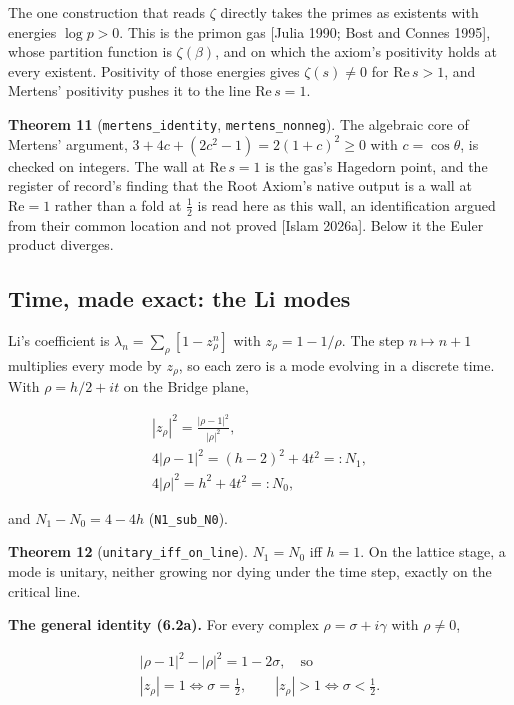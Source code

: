 \documentclass[10pt,twocolumn]{article}
\begin{document}
The one construction that reads \(\zeta\) directly takes the primes as
existents with energies \(\log p > 0\). This is the primon gas {[}Julia
1990; Bost and Connes 1995{]}, whose partition function is
\(\zeta(\beta)\), and on which the axiom's positivity holds at every
existent. Positivity of those energies gives \(\zeta(s) \neq 0\) for
\(\mathrm{Re}\, s > 1\), and Mertens' positivity pushes it to the line
\(\mathrm{Re}\, s = 1\).

\textbf{Theorem 11} (\texttt{mertens\_identity},
\texttt{mertens\_nonneg}). The algebraic core of Mertens' argument,
\(3 + 4c + (2c^2 - 1) = 2(1 + c)^2 \geq 0\) with \(c = \cos\theta\), is
checked on integers. The wall at \(\mathrm{Re}\, s = 1\) is the gas's
Hagedorn point, and the register of record's finding that the Root
Axiom's native output is a wall at \(\mathrm{Re} = 1\) rather than a
fold at \(\tfrac12\) is read here as this wall, an identification argued
from their common location and not proved {[}Islam 2026a{]}. Below it
the Euler product diverges.

\hypertarget{time-made-exact-the-li-modes}{%
\subsection{Time, made exact: the Li
modes}\label{time-made-exact-the-li-modes}}

Li's coefficient is \(\lambda_n = \sum_\rho [1 - z_\rho^n]\) with
\(z_\rho = 1 - 1/\rho\). The step \(n \mapsto n + 1\) multiplies every
mode by \(z_\rho\), so each zero is a mode evolving in a discrete time.
With \(\rho = h/2 + it\) on the Bridge plane,

\[\begin{gathered}|z_\rho|^2 = \frac{|\rho - 1|^2}{|\rho|^2}, \\ 4|\rho-1|^2 = (h-2)^2 + 4t^2 =: N_1, \\ 4|\rho|^2 = h^2 + 4t^2 =: N_0,\end{gathered}\]

and \(N_1 - N_0 = 4 - 4h\) (\texttt{N1\_sub\_N0}).

\textbf{Theorem 12} (\texttt{unitary\_iff\_on\_line}). \(N_1 = N_0\) iff
\(h = 1\). On the lattice stage, a mode is unitary, neither growing nor
dying under the time step, exactly on the critical line.

\textbf{The general identity (6.2a).} For every complex
\(\rho = \sigma + i\gamma\) with \(\rho \neq 0\),

\[\begin{gathered}|\rho - 1|^2 - |\rho|^2 = 1 - 2\sigma, \quad\text{so}\\ |z_\rho| = 1 \iff \sigma = \tfrac12, \qquad |z_\rho| > 1 \iff \sigma < \tfrac12.\end{gathered}\]
\end{document}
